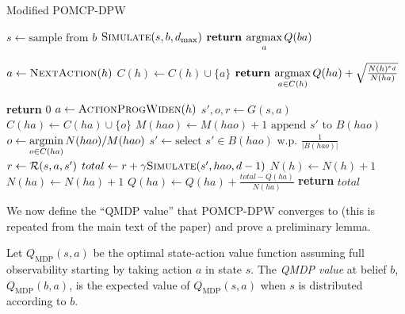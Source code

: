 \begin{algorithm}[htb]
    \caption{Modified POMCP-DPW} \label{alg:mpomcpdpw}
    \begin{algorithmic}[1]
                \State $s \gets \text{sample from }b$ \label{lin:msample}
                \State $\Call{Simulate}{s, b, d_\text{max}}$
            \EndFor
            \State $\textbf{return } \underset{a}{\argmax}\, Q(ba)$
        \EndProcedure

                \State $a \gets \Call{NextAction}{h}$
                \State $C(h) \gets C(h) \cup \{a\}$
            \EndIf
            \State $\textbf{return } \underset{a \in C(h)}{\argmax}\, Q(ha) + \sqrt{\frac{N(h)^{e_d}}{N(ha)}}$
        \EndProcedure

                \State \textbf{return} $0$
            \EndIf
            \State $a \gets \Call{ActionProgWiden}{h}$
                \State $s',o,r \gets G(s,a)$
                \State $C(ha) \gets C(ha) \cup \{o\}$
                \State $M(hao) \gets M(hao) + 1$ \label{lin:gencount}
                \State $\text{append } s' \text{ to } B(hao)$ \label{lin:minsertion}
            \Else
                \State $o \gets \underset{o \in C(ha)}{\argmin}\, N(hao)/M(hao)$
                \State $s' \gets \text{select } s' \in B(hao) \text{ w.p. } \frac{1}{|B(hao)|}$
                \State $r \gets \mathcal{R}(s,a,s')$
            \EndIf
            \State $total \gets r + \gamma \Call{Simulate}{s', hao, d-1}$
            \State $N(h) \gets N(h)+1$
            \State $N(ha) \gets N(ha)+1$
            \State $Q(ha) \gets Q(ha) + \frac{total - Q(ha)}{N(ha)}$
            \State \textbf{return} $total$
        \EndProcedure
    \end{algorithmic}        
\end{algorithm}

We now define the ``QMDP value'' that POMCP-DPW converges to (this is repeated from the main text of the paper) and prove a preliminary lemma.

\begin{definition}
     Let $Q_\text{MDP}(s,a)$ be the optimal state-action value function assuming full observability starting by taking action $a$ in state $s$.
     The \emph{QMDP value} at belief $b$, $Q_\text{MDP}(b,a)$, is the expected value of $Q_\text{MDP}(s,a)$ when $s$ is distributed according to $b$.   
\end{definition}

